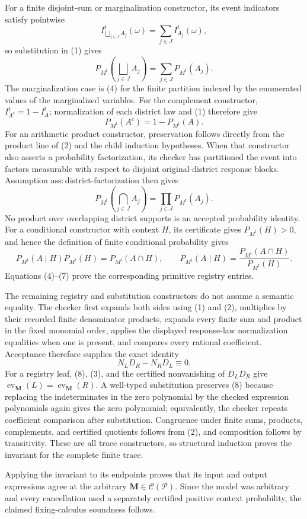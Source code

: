 For a finite disjoint-sum or marginalization constructor, its event indicators
satisfy pointwise
\[
 I_{\bigsqcup_{j\in J}A_j}^t(\omega)
 =\sum_{j\in J}I_{A_j}^t(\omega),
\]
so substitution in (1) gives
\[
 P_{M^t}\!\left(\bigsqcup_{j\in J}A_j\right)
 =\sum_{j\in J}P_{M^t}(A_j).
 \tag{4}
\]
The marginalization case is (4) for the finite partition indexed by the
enumerated values of the marginalized variables.  For the complement
constructor, \(I_{A^c}^t=1-I_A^t\); normalization of each district law and
(1) therefore give
\[
 P_{M^t}(A^c)=1-P_{M^t}(A).
 \tag{5}
\]
For an arithmetic product constructor, preservation follows directly from the
product line of (2) and the child induction hypotheses.  When that constructor
also asserts a probability factorization, its checker has partitioned the
event into factors measurable with respect to disjoint original-district
response blocks.  Assumption
\(\mathrm{ass:district\text{-}factorization}\) then gives
\[
 P_{M^t}\!\left(\bigcap_{j\in J}A_j\right)
 =\prod_{j\in J}P_{M^t}(A_j).
 \tag{6}
\]
No product over overlapping district supports is an accepted probability
identity.  For a conditional constructor with context \(H\), its certificate
gives \(P_{M^t}(H)>0\), and hence the definition of finite conditional
probability gives
\[
 P_{M^t}(A\mid H)P_{M^t}(H)=P_{M^t}(A\cap H),
 \qquad
 P_{M^t}(A\mid H)
 =\frac{P_{M^t}(A\cap H)}{P_{M^t}(H)}.
 \tag{7}
\]
Equations (4)--(7) prove the corresponding primitive registry entries.

The remaining registry and substitution constructors do not assume a semantic
equality.  The checker first expands both sides using (1) and (2), multiplies
by their recorded finite denominator products, expands every finite sum and
product in the fixed monomial order, applies the displayed response-law
normalization equalities when one is present, and compares every rational
coefficient.  Acceptance therefore supplies the exact identity
\[
 N_LD_R-N_RD_L\equiv0.
 \tag{8}
\]
For a registry leaf, (8), (3), and the certified nonvanishing of \(D_LD_R\)
give \(\operatorname{ev}_{\mathbf M}(L)=
\operatorname{ev}_{\mathbf M}(R)\).  A well-typed substitution preserves (8)
because replacing the indeterminates in the zero polynomial by the checked
expression polynomials again gives the zero polynomial; equivalently, the
checker repeats coefficient comparison after substitution.  Congruence under
finite sums, products, complements, and certified quotients follows from (2),
and composition follows by transitivity.  These are all trace constructors,
so structural induction proves the invariant for the complete finite trace.

Applying the invariant to its endpoints proves that its input and output
expressions agree at the arbitrary
\(\mathbf M\in\mathcal C(\mathcal P)\).  Since the model was arbitrary and
every cancellation used a separately certified positive context probability,
the claimed fixing-calculus soundness follows.